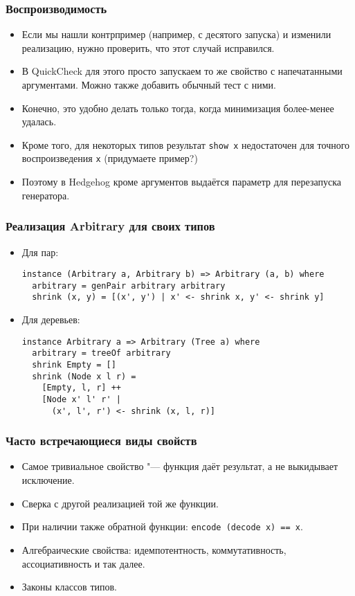 \documentclass[11pt]{beamer}
\begin{document}
\begin{frame}[fragile]
  \frametitle{Воспроизводимость}
  \begin{itemize}
    \item Если мы нашли контрпример (например, с десятого запуска) и изменили реализацию, нужно проверить, что этот случай исправился.
    \item В QuickCheck для этого просто запускаем то же свойство с напечатанными аргументами. Можно также добавить обычный тест с ними.
    \item Конечно, это удобно делать только тогда, когда минимизация более-менее удалась.
    \item Кроме того, для некоторых типов результат \lstinline|show x| недостаточен для точного воспроизведения \lstinline|x| (придумаете пример?)
    \item Поэтому в Hedgehog кроме аргументов выдаётся параметр для перезапуска генератора.
  \end{itemize}
\end{frame}

\begin{frame}[fragile]
  \frametitle{Реализация Arbitrary для своих типов}
  \begin{itemize}
    \item Для пар:
          \begin{lstlisting}[basicstyle=\ttfamily\small]
instance (Arbitrary a, Arbitrary b) => Arbitrary (a, b) where
  arbitrary = genPair arbitrary arbitrary
  shrink (x, y) = [(x', y') | x' <- shrink x, y' <- shrink y]
\end{lstlisting}
    \item Для деревьев:
          \begin{lstlisting}[basicstyle=\ttfamily\small]
instance Arbitrary a => Arbitrary (Tree a) where
  arbitrary = treeOf arbitrary
  shrink Empty = []
  shrink (Node x l r) = 
    [Empty, l, r] ++
    [Node x' l' r' | 
      (x', l', r') <- shrink (x, l, r)]
\end{lstlisting}
  \end{itemize}
\end{frame}

\begin{frame}[fragile]
  \frametitle{Часто встречающиеся виды свойств}
  \begin{itemize}
    \item Самое тривиальное свойство "--- функция даёт результат, а не выкидывает исключение.
    \item Сверка с другой реализацией той же функции.
    \item При наличии также обратной функции: \lstinline|encode (decode x) == x|.
    \item Алгебраические свойства: идемпотентность, коммутативность, ассоциативность и так далее.
    \item Законы классов типов.
  \end{itemize}
\end{frame}
\end{document}
